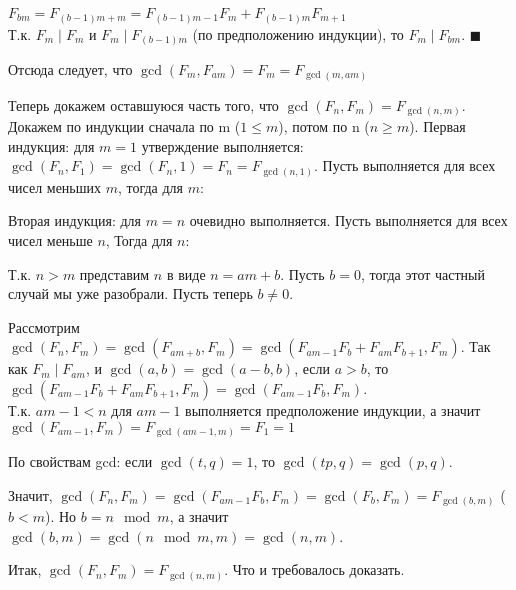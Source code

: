\documentclass[10pt]{article}
\begin{document}
\begin{enumerate}
	 $F_{bm} = F_{(b-1)m + m} = F_{(b-1)m-1}F_m + F_{(b-1)m} F_{m+1}$\\
	 Т.к. $F_m \mid F_m$ и $F_m \mid F_{(b-1)m}$ (по предположению индукции), то $F_m \mid F_{bm}$. $\blacksquare$
	
	Отсюда следует, что $\gcd(F_m, F_{am}) = F_m = F_{\gcd(m, am)}$
	
	Теперь докажем оставшуюся часть того, что $\gcd(F_n, F_m) = F_{\gcd(n, m)}$.\\
	Докажем по индукции сначала по m ($1 \le m$), потом по n ($n \ge m$). Первая индукция: для $m=1$ утверждение выполняется: $\gcd(F_n, F_1) = \gcd(F_n, 1) = F_n = F_{\gcd(n, 1)}$. Пусть выполняется для всех чисел меньших $m$, тогда для $m$:
	
	  Вторая индукция: для $m=n$ очевидно выполняется. Пусть выполняется для всех чисел меньше $n$, Тогда для $n$:
	
	Т.к. $n > m$ представим $n$ в виде $n = am +b$. Пусть $b=0$, тогда этот частный случай мы уже разобрали. Пусть теперь $b\neq0$.
	
	  Рассмотрим $\gcd(F_n, F_m) = \gcd(F_{am+b}, F_m) = \gcd(F_{am-1}F_b + F_{am}F_{b+1}, F_m)$. Так как $F_m \mid F_{am}$, и $\gcd(a, b)=\gcd(a-b, b)$, если $a>b$, то $\gcd(F_{am-1}F_b + F_{am}F_{b+1}, F_m) = \gcd(F_{am-1}F_b, F_m)$.\\
	Т.к. $am-1 < n$ для $am-1$ выполняется предположение индукции, а значит\\ $\gcd(F_{am-1}, F_m) = F_{\gcd(am-1, m)} = F_1 = 1$
	
	По свойствам gcd: если $\gcd(t, q)=1$, то $\gcd(tp, q) = \gcd(p, q)$.
	
	Значит, $\gcd(F_n, F_m) = \gcd(F_{am-1}F_b, F_m) = \gcd(F_b, F_m) = F_{\gcd(b, m)}$ ($b<m$). Но $b= n\mod m$, а значит $\gcd(b, m) = \gcd(n \mod m, m) = \gcd(n, m)$.
	
	Итак, $\gcd(F_n, F_m) = F_{\gcd(n, m)}$. Что и требовалось доказать.
\end{enumerate}
\end{document}
